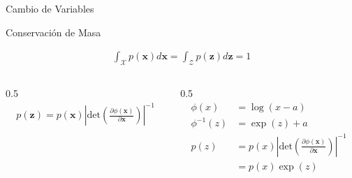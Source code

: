 \documentclass[aspectratio=169, 10pt]{beamer}
\begin{document}
\begin{frame}{Cambio de Variables}
	\begin{block}{Conservación de Masa}		
		
			\begin{align*}
			\int_{\mathcal X} p(\mathbf{x}) d\mathbf{x}= \int_{\mathcal Z} p(\mathbf{z}) d\mathbf{z}=1
			\end{align*}
	
		
	\end{block}

\begin{columns}[T]
	\begin{column}{0.5\textwidth}
	\begin{align*}
		p(\mathbf{z}) = p(\mathbf{x}) \left\vert \text{det}\left(\frac{\partial \phi(\mathbf{x})}{\partial \mathbf{x}}\right) \right\vert ^{-1}
	\end{align*}
	\end{column}
	
	\begin{column}{0.5\textwidth}
	\begin{align*}
		\phi(x)&=\log(x-a)\\
		\phi^{-1}(z)&=\exp(z)+a\\
		p(z)&=p(x)\left\vert \text{det}\left(\frac{\partial \phi(\mathbf{x})}{\partial \mathbf{x}}\right) \right\vert ^{-1}\\
		&=p(x)\exp(z)
	\end{align*}
	\end{column}
\end{columns}	

	
	
\end{frame}
\end{document}
